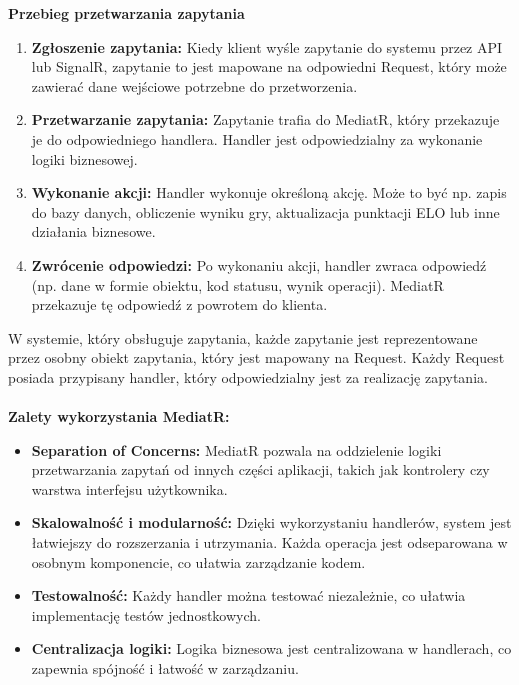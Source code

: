 \documentclass[12pt,a4paper]{article}
\begin{document}
\textbf{Przebieg przetwarzania zapytania}
\begin{enumerate}
    \item \textbf{Zgłoszenie zapytania:} Kiedy klient wyśle zapytanie do systemu przez API lub SignalR, zapytanie to jest mapowane na odpowiedni Request, który może zawierać dane wejściowe potrzebne do przetworzenia.
    \item \textbf{Przetwarzanie zapytania:} Zapytanie trafia do MediatR, który przekazuje je do odpowiedniego handlera. Handler jest odpowiedzialny za wykonanie logiki biznesowej.
    \item \textbf{Wykonanie akcji:} Handler wykonuje określoną akcję. Może to być np. zapis do bazy danych, obliczenie wyniku gry, aktualizacja punktacji ELO lub inne działania biznesowe.
    \item \textbf{Zwrócenie odpowiedzi:} Po wykonaniu akcji, handler zwraca odpowiedź (np. dane w formie obiektu, kod statusu, wynik operacji). MediatR przekazuje tę odpowiedź z powrotem do klienta.
\end{enumerate}

\noindent
W systemie, który obsługuje zapytania, każde zapytanie jest reprezentowane przez osobny obiekt zapytania, który jest mapowany na Request. Każdy Request posiada przypisany handler, który odpowiedzialny jest za realizację zapytania.
\\\\

\textbf{Zalety wykorzystania MediatR:}
\begin{itemize}
    \item \textbf{Separation of Concerns:} MediatR pozwala na oddzielenie logiki przetwarzania zapytań od innych części aplikacji, takich jak kontrolery czy warstwa interfejsu użytkownika.
    \item \textbf{Skalowalność i modularność:} Dzięki wykorzystaniu handlerów, system jest łatwiejszy do rozszerzania i utrzymania. Każda operacja jest odseparowana w osobnym komponencie, co ułatwia zarządzanie kodem.
    \item \textbf{Testowalność:} Każdy handler można testować niezależnie, co ułatwia implementację testów jednostkowych.
    \item \textbf{Centralizacja logiki:} Logika biznesowa jest centralizowana w handlerach, co zapewnia spójność i łatwość w zarządzaniu.
\end{itemize}

\newpage
\end{document}
